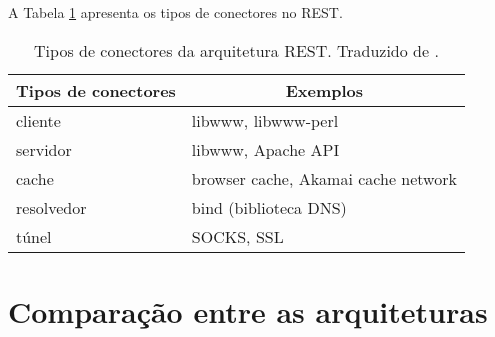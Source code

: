     A Tabela \ref{rest-connectors-elements} apresenta os tipos de conectores no REST.
    
    \begin{table}[ht!]
    \centering
    \caption{Tipos de conectores da arquitetura REST. Traduzido de \cite{fielding2002}.}
    \label{rest-connectors-elements}
    \begin{tabular}{l|l}
    \hline
    \multicolumn{1}{c|}{\textbf{Tipos de conectores}} & \multicolumn{1}{c}{\textbf{Exemplos}} \\ \hline
    cliente                                            & libwww, libwww-perl                    \\ \hline
    servidor                                           & libwww, Apache API                     \\ \hline
    cache                                              & browser cache, Akamai cache network    \\ \hline
    resolvedor                                         & bind (biblioteca DNS)                  \\ \hline
    túnel                                              & SOCKS, SSL                             \\ \hline
    \end{tabular}
    \end{table}

\section{Comparação entre as arquiteturas}

